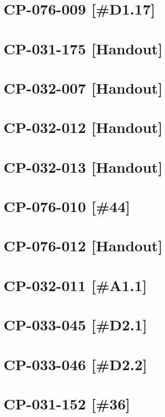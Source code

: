\section{CP-076-009 [\#D1.17]}\newpage

\setcounter{section}{0}

\section{CP-031-175 [Handout]}\newpage	
\section{CP-032-007 [Handout]}\newpage	
\section{CP-032-012 [Handout]}\newpage	
\section{CP-032-013 [Handout]}\newpage	
\section{CP-076-010 [\#44]}\newpage	
\section{CP-076-012 [Handout]}\newpage

\setcounter{section}{0}

\section{CP-032-011 [\#A1.1]}\newpage
\section{CP-033-045 [\#D2.1]}\newpage
\section{CP-033-046 [\#D2.2]}\newpage
\section{CP-031-152 [\#36]}\newpage
